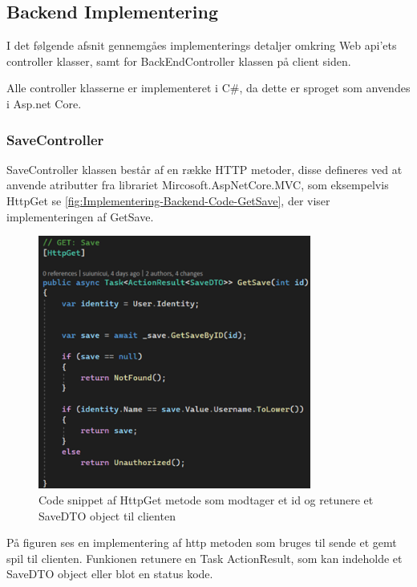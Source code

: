 \subsection{Backend Implementering}

I det følgende afsnit gennemgåes implementerings detaljer omkring Web api'ets controller klasser, samt for BackEndController klassen på client siden.

Alle controller klasserne er implementeret i C\#, da dette er sproget som anvendes i Asp.net Core. \\


\subsubsection{SaveController}

SaveController klassen består af en række HTTP metoder, disse defineres ved at anvende atributter fra librariet Mircosoft.AspNetCore.MVC, som eksempelvis HttpGet se \autoref{fig:Implementering-Backend-Code-GetSave}, der viser implementeringen af GetSave.

\begin{figure}[H]
\centering
\includegraphics[width = 0.8\textwidth]{02-Body/Images/Backend_Code_GetSave.PNG}
\caption{Code snippet af HttpGet metode som modtager et id og retunere et SaveDTO object til clienten}
\label{fig:Implementering-Backend-Code-GetSave}
\end{figure}

På figuren ses en implementering af http metoden som bruges til sende et gemt spil til clienten. Funkionen retunere en Task ActionResult, som kan indeholde et SaveDTO object eller blot en status kode.


